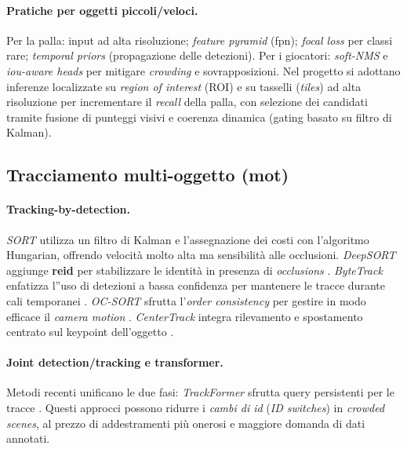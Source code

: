 \documentclass[12pt,a4paper,openright,twoside]{book}
\begin{document}
\paragraph{Pratiche per oggetti piccoli/veloci.} Per la palla: input ad alta risoluzione; \emph{feature pyramid} (\ac{fpn});
\emph{focal loss} per classi rare; \emph{temporal priors} (propagazione delle detezioni). Per i giocatori: \emph{soft-NMS} e
\emph{\ac{iou}-aware heads} per mitigare \emph{crowding} e sovrapposizioni. Nel progetto si adottano inferenze localizzate su
\emph{region of interest} (ROI) e su tasselli (\emph{tiles}) ad alta risoluzione per incrementare il \emph{recall} della palla,
con selezione dei candidati tramite fusione di punteggi visivi e coerenza dinamica (gating basato su filtro di Kalman).

\subsection{Tracciamento multi-oggetto (\ac{mot})}

\paragraph{Tracking-by-detection.} \textit{SORT} utilizza un filtro di Kalman e l'assegnazione dei costi con l'algoritmo Hungarian,
offrendo velocità molto alta ma sensibilità alle occlusioni. 
\textit{DeepSORT} aggiunge \textbf{\ac{reid}} per stabilizzare le identità in presenza di \emph{occlusions} \cite{wojke2017simple}. 
\textit{ByteTrack} enfatizza l''uso di detezioni a bassa confidenza per mantenere le tracce durante cali temporanei \cite{zhang2022bytetrack}.
\textit{OC-SORT} sfrutta l'\emph{order consistency} per gestire in modo efficace il \emph{camera motion} \cite{cao2023ocsort}. 
\textit{CenterTrack} integra rilevamento e spostamento centrato sul keypoint dell'oggetto \cite{zhou2020tracking}.

\paragraph{Joint detection/tracking e transformer.} Metodi recenti unificano le due fasi: \textit{TrackFormer} 
sfrutta query persistenti per le tracce \cite{meinhardt2022trackformer}. Questi approcci possono ridurre i \emph{cambi di \ac{id}} 
(\emph{ID switches}) in \emph{crowded scenes}, al prezzo di addestramenti più onerosi e maggiore domanda di dati annotati.
\end{document}
